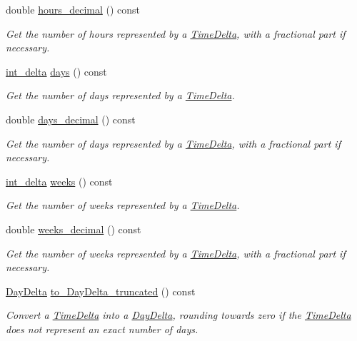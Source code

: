 \begin{DoxyCompactItemize}
double \hyperlink{structTimeDelta_aaae58342e9d06c7c78e9b5dea5cafe02}{hours\-\_\-decimal} () const 
\begin{DoxyCompactList}\small\item\em Get the number of hours represented by a \hyperlink{structTimeDelta}{Time\-Delta}, with a fractional part if necessary. \end{DoxyCompactList}\item 
\hyperlink{types_8h_a8a67cf99971c5cfeeaa2380ba84a4c92}{int\-\_\-delta} \hyperlink{structTimeDelta_abad8a94a6c022af1a1871e452eca47ea}{days} () const 
\begin{DoxyCompactList}\small\item\em Get the number of days represented by a \hyperlink{structTimeDelta}{Time\-Delta}. \end{DoxyCompactList}\item 
double \hyperlink{structTimeDelta_aa73d3724b83ed4badb44b714d86124a2}{days\-\_\-decimal} () const 
\begin{DoxyCompactList}\small\item\em Get the number of days represented by a \hyperlink{structTimeDelta}{Time\-Delta}, with a fractional part if necessary. \end{DoxyCompactList}\item 
\hyperlink{types_8h_a8a67cf99971c5cfeeaa2380ba84a4c92}{int\-\_\-delta} \hyperlink{structTimeDelta_a4e583a79abea664691df4680f4fd467d}{weeks} () const 
\begin{DoxyCompactList}\small\item\em Get the number of weeks represented by a \hyperlink{structTimeDelta}{Time\-Delta}. \end{DoxyCompactList}\item 
double \hyperlink{structTimeDelta_a11ca76e0cb990c9011a0ed91cda9ff8e}{weeks\-\_\-decimal} () const 
\begin{DoxyCompactList}\small\item\em Get the number of weeks represented by a \hyperlink{structTimeDelta}{Time\-Delta}, with a fractional part if necessary. \end{DoxyCompactList}\item 
\hyperlink{structDayDelta}{Day\-Delta} \hyperlink{structTimeDelta_a9ec83cf81fc5e809bfdad62b084c9456}{to\-\_\-\-Day\-Delta\-\_\-truncated} () const 
\begin{DoxyCompactList}\small\item\em Convert a \hyperlink{structTimeDelta}{Time\-Delta} into a \hyperlink{structDayDelta}{Day\-Delta}, rounding towards zero if the \hyperlink{structTimeDelta}{Time\-Delta} does not represent an exact number of days. \end{DoxyCompactList}\item 

\end{DoxyCompactItemize}
